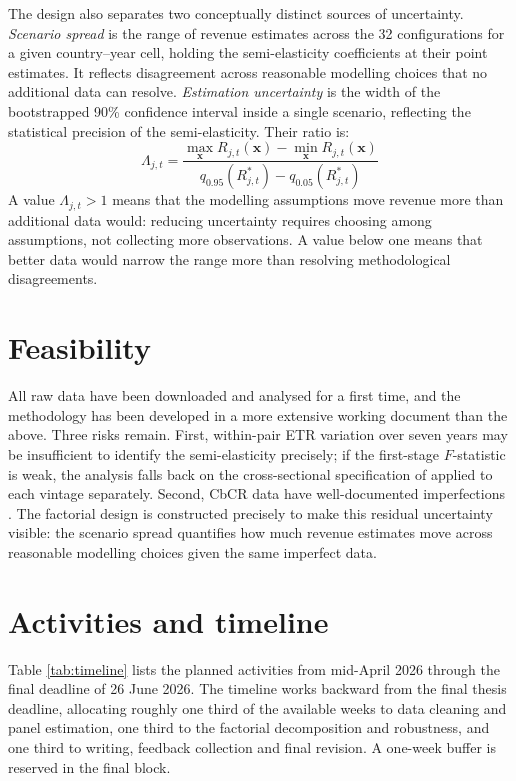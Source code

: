 \documentclass[11pt,a4paper]{article}
\begin{document}
The design also separates two conceptually distinct sources of uncertainty. \emph{Scenario spread} is the range of revenue estimates across the 32 configurations for a given country--year cell, holding the semi-elasticity coefficients at their point estimates. It reflects disagreement across reasonable modelling choices that no additional data can resolve. \emph{Estimation uncertainty} is the width of the bootstrapped 90\% confidence interval inside a single scenario, reflecting the statistical precision of the semi-elasticity. Their ratio is:
\begin{equation}\label{eq:spread_ratio}
\Lambda_{j,t} = \frac{\max_{\mathbf{x}} R_{j,t}(\mathbf{x}) - \min_{\mathbf{x}} R_{j,t}(\mathbf{x})}{q_{0.95}(R_{j,t}^{*}) - q_{0.05}(R_{j,t}^{*})}
\end{equation}
A value $\Lambda_{j,t} > 1$ means that the modelling assumptions move revenue more than additional data would: reducing uncertainty requires choosing among assumptions, not collecting more observations. A value below one means that better data would narrow the range more than resolving methodological disagreements.

\section{Feasibility}\label{sec:feasibility}

All raw data have been downloaded and analysed for a first time, and the methodology has been developed in a more extensive working document than the above. Three risks remain. First, within-pair ETR variation over seven years may be insufficient to identify the semi-elasticity precisely; if the first-stage $F$-statistic is weak, the analysis falls back on the cross-sectional specification of \citet{garcia-bernardo2024} applied to each vintage separately. Second, CbCR data have well-documented imperfections \citep{bobeldijk2019,godar2024,blouin2023}. The factorial design is constructed precisely to make this residual uncertainty visible: the scenario spread quantifies how much revenue estimates move across reasonable modelling choices given the same imperfect data.

\section{Activities and timeline}\label{sec:timeline}

Table \ref{tab:timeline} lists the planned activities from mid-April 2026 through the final deadline of 26 June 2026. The timeline works backward from the final thesis deadline, allocating roughly one third of the available weeks to data cleaning and panel estimation, one third to the factorial decomposition and robustness, and one third to writing, feedback collection and final revision. A one-week buffer is reserved in the final block.
\end{document}
